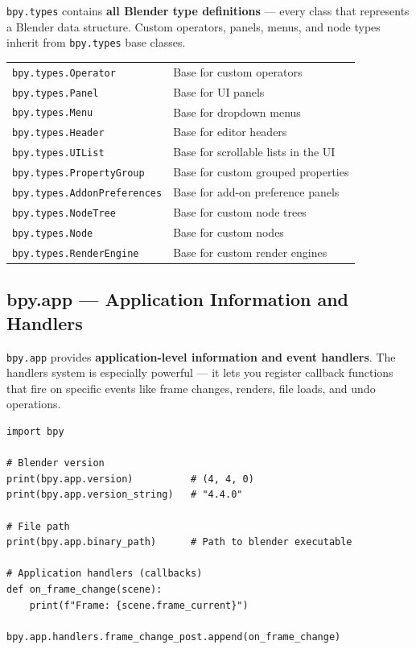 \texttt{bpy.types} contains \textbf{all Blender type definitions} --- every class that represents a Blender data structure. Custom operators, panels, menus, and node types inherit from \texttt{bpy.types} base classes.

\begin{center}
\begin{tabularx}{\textwidth}{L{5.5cm}X}
\toprule
{}
 &  \\
\midrule
\texttt{bpy.types.Operator} & Base for custom operators \\
\texttt{bpy.types.Panel} & Base for UI panels \\
\texttt{bpy.types.Menu} & Base for dropdown menus \\
\texttt{bpy.types.Header} & Base for editor headers \\
\texttt{bpy.types.UIList} & Base for scrollable lists in the UI \\
\texttt{bpy.types.PropertyGroup} & Base for custom grouped properties \\
\texttt{bpy.types.AddonPreferences} & Base for add-on preference panels \\
\texttt{bpy.types.NodeTree} & Base for custom node trees \\
\texttt{bpy.types.Node} & Base for custom nodes \\
\texttt{bpy.types.RenderEngine} & Base for custom render engines \\
\bottomrule
\end{tabularx}
\end{center}

\subsection{bpy.app --- Application Information and Handlers}

\texttt{bpy.app} provides \textbf{application-level information and event handlers}. The handlers system is especially powerful --- it lets you register callback functions that fire on specific events like frame changes, renders, file loads, and undo operations.

\begin{lstlisting}
import bpy

# Blender version
print(bpy.app.version)          # (4, 4, 0)
print(bpy.app.version_string)   # "4.4.0"

# File path
print(bpy.app.binary_path)      # Path to blender executable

# Application handlers (callbacks)
def on_frame_change(scene):
    print(f"Frame: {scene.frame_current}")

bpy.app.handlers.frame_change_post.append(on_frame_change)
\end{lstlisting}

